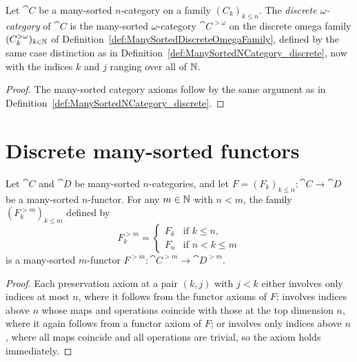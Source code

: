 \begin{construction}
  \label{def:ManySortedNCategory_discreteOmega}
  \leanok
  Let $\cat{C}$ be a many-sorted $n$-category on a family $(C_k)_{k \leq n}$. The \emph{discrete
  $\omega$-category} of $\cat{C}$ is the many-sorted $\omega$-category $\cat{C}^{>\omega}$ on the
  discrete omega family $(C^{>\omega}_k)_{k \in \mathbb{N}}$ of
  Definition~\ref{def:ManySortedDiscreteOmegaFamily}, defined by the same case distinction as in
  Definition~\ref{def:ManySortedNCategory_discrete}, now with the indices $k$ and $j$ ranging over
  all of $\mathbb{N}$.
\end{construction}

\begin{proof}
  \leanok
  The many-sorted category axioms follow by the same argument as in
  Definition~\ref{def:ManySortedNCategory_discrete}.
\end{proof}

\section{Discrete many-sorted functors}

\begin{construction}
  \label{def:ManySortedNFunctor_discrete}
  \leanok
  Let $\cat{C}$ and $\cat{D}$ be many-sorted $n$-categories, and let $F = (F_k)_{k \leq n} \colon
  \cat{C} \to \cat{D}$ be a many-sorted $n$-functor. For any $m \in \mathbb{N}$ with $n < m$, the family
  $(F^{>m}_k)_{k \leq m}$ defined by
  \[
    F^{>m}_k =
    \begin{cases}
      F_k & \text{if } k \leq n, \\
      F_n & \text{if } n < k \leq m
    \end{cases}
  \]
  is a many-sorted $m$-functor $F^{>m} \colon \cat{C}^{>m} \to \cat{D}^{>m}$.
\end{construction}

\begin{proof}
  \leanok
  Each preservation axiom at a pair $(k, j)$ with $j < k$ either involves only indices at most $n$,
  where it follows from the functor axioms of $F$; involves indices above $n$ whose maps and
  operations coincide with those at the top dimension $n$, where it again follows from a functor
  axiom of $F$; or involves only indices above $n$, where all maps coincide and all operations are
  trivial, so the axiom holds immediately.
\end{proof}

